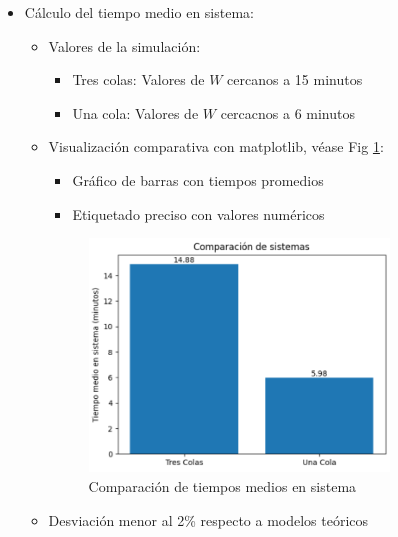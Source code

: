 \documentclass{article}
\begin{document}
\begin{itemize}
    \item Cálculo del tiempo medio en sistema:
        \begin{itemize}
            \item Valores de la simulación:
                \begin{itemize}
                    \item Tres colas: Valores de $W$ cercanos a 15 minutos 
                    \item Una cola: Valores de $W$ cercacnos a 6 minutos
                \end{itemize}

            \item Visualización comparativa con matplotlib, véase Fig \ref{fig:tiempo_sistema}:
                \begin{itemize}
                    \item Gráfico de barras con tiempos promedios
                    \item Etiquetado preciso con valores numéricos
                \end{itemize}
                \begin{figure}[h]
                    \centering
                    \includegraphics[width=0.8\textwidth]{./images/Tiempo medio en sistema.png}
                    \caption{Comparación de tiempos medios en sistema}
                    \label{fig:tiempo_sistema}
                \end{figure}
            
                \newpage
                
            \item Desviación menor al 2\% respecto a modelos teóricos
        

\end{itemize}
\end{itemize}
\end{document}
